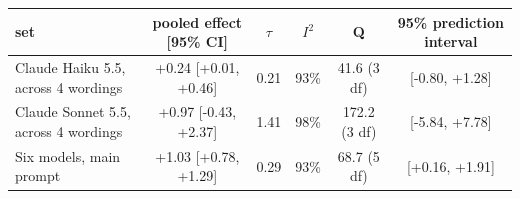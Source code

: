\begin{tabular}{lccccc}
\toprule
 set & pooled effect [95\% CI] & $\tau$ & $I^2$ & Q & 95\% prediction interval \\
\midrule
Claude Haiku 5.5, across 4 wordings & +0.24 [+0.01, +0.46] & 0.21 & 93\% & 41.6 (3 df) & [-0.80, +1.28] \\
Claude Sonnet 5.5, across 4 wordings & +0.97 [-0.43, +2.37] & 1.41 & 98\% & 172.2 (3 df) & [-5.84, +7.78] \\
Six models, main prompt & +1.03 [+0.78, +1.29] & 0.29 & 93\% & 68.7 (5 df) & [+0.16, +1.91] \\
\bottomrule
\end{tabular}
